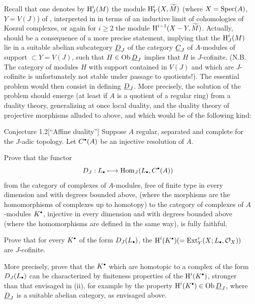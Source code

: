 Recall that one denotes by $\operatorname{H}^i_J (M)$ the module $\operatorname{H}^i_Y (X, \widetilde{M})$ (where $X=\operatorname{Spec} (A)$, $Y=V(J)$) of \Exp {}, interpreted in  in terms of an inductive limit of cohomologies of Koszul complexes, or again for $i\ge 2$ the module $\operatorname{H}^{i-1} (X-Y, \widetilde{M})$. Actually,  should be a consequence of a more precise statement, implying that the $\operatorname{H}^i_J ({M})$ lie in a suitable abelian subcategory ${\underline{D}_J}$ of the category ${\underline{C}_J}$ of $A$-modules of support $\subset Y=V(J)$, such that $H\in \operatorname{Ob} {\underline{D}_J}$ implies that $H$ is $J$-cofinite. (N.B. The category of modules $H$ with support contained in $V(J)$ and which are $J$-cofinite is unfortunately not stable under passage to quotients!). The essential problem would then consist in defining ${\underline{D}_J}$. More precisely, the solution of the problem  should emerge (at least if $A$ is a quotient of a regular ring) from a duality theory, generalizing at once local duality, and the duality theory of projective morphisms alluded to above, and which would be of the following kind:

 \label{XIII.1.2}
\begin{enonce*}{Conjecture 1.2}[``Affine duality''\sfootnotemark]
 Suppose $A$ regular, separated and complete for the $J$-adic topology. Let $C^{\boule}(A)$ be an injective resolution of $A$.
\begin{enumeratei}
\item
Prove that the functor
$$D_J: L_{\boule}\mto \Hom_J(L_{\boule}, C^{\boule}(A))$$
from the category of complexes of $A$-modules, free of finite type in every dimension and with degrees bounded above, (where the morphisms are the homomorphisms of complexes up to homotopy) to the category of complexes of $A$-modules $K^{\boule}$, injective in every dimension and with degrees bounded above (where the homomorphisms are defined in the same way), is fully faithful.

\item
Prove that for every $K^{\boule}$ of the form $D_J(L_{\boule})$, the $\H^i(K^{\boule})(= \Ext_Y^i (X; L_{\boule}, \OX))$ are $J$-cofinite.

\item
More precisely, prove that the $K^{\boule}$ which are homotopic to a complex of the form $D_J(L_{\boule})$ can be characterized by finiteness properties of the $\H^i(K^{\boule})$, stronger than that envisaged in (ii), for example by the property $\H^i(K^{\boule})\in \Ob {\DDJ}$, where ${\underline{D}_J}$ is a suitable abelian category, as envisaged above.
\end{enumeratei}
\end{enonce*}

